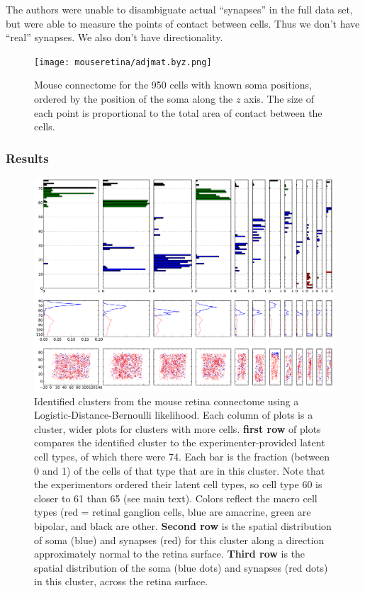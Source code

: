 \documentclass{article}
\begin{document}
The authors were unable to disambiguate actual ``synapses'' in the
full data set, but were able to measure the points of contact between
cells. Thus we don't have ``real'' synapses. We also don't have directionality. 

\begin{figure}
  \centering 
  \texttt{[image: mouseretina/adjmat.byz.png]}
  \caption{Mouse connectome for the 950 cells with known soma positions, ordered by the position of the soma along the $z$ axis. The size of each point is proportional to the total area of contact between the cells.}
  \label{fig:mouseretina:adj}
\end{figure}

\subsubsection{Results}

\begin{figure}
  \centering 
  \includegraphics[width=\textwidth]{mouseretina/retina.1.0.ld.0.0.data-fixed_20_100-anneal_slow_400.0.clusters.pdf}
  \caption{Identified clusters from the mouse retina connectome using a Logistic-Distance-Bernoulli likelihood. Each column of plots is a cluster, wider plots for clusters with more cells. \textbf{first row} of plots compares the identified cluster to the experimenter-provided latent cell types, of which there were 74. Each bar is the fraction (between 0 and 1) of the cells of that type that are in this cluster. Note that the experimentors ordered their latent cell types, so cell type 60 is closer to 61 than 65 (see main text). Colors reflect the macro cell types (red = retinal ganglion cells, blue are amacrine, green are bipolar, and black are other. \textbf{Second row} is the spatial distribution of soma (blue) and synapses (red) for this cluster along a direction approximately normal to the retina surface. \textbf{Third row} is the spatial distribution of the soma (blue dots) and synapses (red dots) in this cluster, across the retina surface.}
  \label{fig:mouseretina:clusters}
\end{figure}
\end{document}
